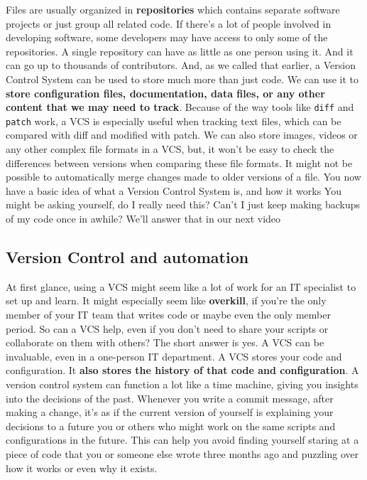 	Files are usually organized in \textbf{repositories} which contains separate software projects or just group all related code. If there's a lot of people involved in developing software, some developers may have access to only some of the repositories. 
	A single repository can have as little as one person using it. And it can go up to thousands of contributors. And, as we called that earlier, a Version Control System can be used to store much more than just code. We can use it to \textbf{store configuration files, documentation, data files, or any other content that we may need to track}. Because of the way tools like \texttt{diff} and \texttt{patch} work, a VCS is especially useful when tracking text files, which can be compared with diff and modified with patch. We can also store images, videos or any other complex file formats in a VCS, but, it won't be easy to check the differences between versions when comparing these file formats. It might not be possible to automatically merge changes made to older versions of a file. You now have a basic idea of what a Version Control System is, and how it works You might be asking yourself, do I really need this? Can't I just keep making backups of my code once in awhile? We'll answer that in our next video
	
	\subsection{Version Control and automation}
	
	At first glance, using a VCS might seem like a lot of work for an IT specialist to set up and learn. It might especially seem like \textbf{overkill}, if you're the only member of your IT team that writes code or maybe even the only member period. 
	So can a VCS help, even if you don't need to share your scripts or collaborate on them with others? The short answer is yes. A VCS can be invaluable, even in a one-person IT department. A VCS stores your code and configuration. It \textbf{also stores the history of that code and configuration}. A version control system can function a lot like a time machine, giving you insights into the decisions of the past. Whenever you write a commit message, after making a change, it's as if the current version of yourself is explaining your decisions to a future you or others who might work on the same scripts and configurations in the future. This can help you avoid finding yourself staring at a piece of code that you or someone else wrote three months ago and puzzling over how it works or even why it exists. 
	
